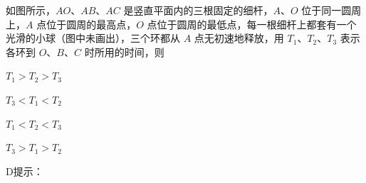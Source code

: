 如图所示，\(AO\)、\(AB\)、\(AC\) 是竖直平面内的三根固定的细杆，\(A\)、\(O\) 位于同一圆周上，\(A\) 点位于圆周的最高点，\(O\) 点位于圆周的最低点，每一根细杆上都套有一个光滑的小球（图中未画出），三个环都从 \(A\) 点无初速地释放，用 \(T_1\)、\(T_2\)、\(T_3\) 表示各环到 \(O\)、\(B\)、\(C\) 时所用的时间，则\paren[]
	
\begin{choices}
	\item \(T_1 > T_2 > T_3\)
	\item \(T_3 < T_1 < T_2\)
	\item \(T_1 < T_2 < T_3\)
	\item \(T_3 > T_1 > T_2\)
\end{choices}
\begin{answer}
    D\qquad 提示：
\end{answer}